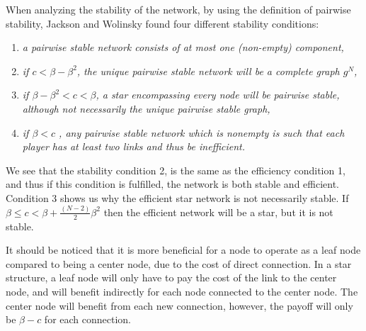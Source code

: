 When analyzing the stability of the network, by using the definition of pairwise stability, Jackson and Wolinsky found four different stability conditions:

\begin{enumerate}
\item \textit{a pairwise stable network consists of at most one (non-empty) component,}
\item \textit{if $c<\beta - \beta^2$, the unique pairwise stable network will be a complete graph $g^N$, }
\item \textit{if $\beta - \beta^2 <c < \beta $, a star encompassing every node will be pairwise stable, although not necessarily the unique pairwise stable graph,}
\item \textit{if $\beta < c$ , any pairwise stable network which is nonempty is such that each player has at least two links and thus be inefficient. }
\end{enumerate}
We see that the stability condition 2, is the same as the efficiency condition 1, and thus if this condition is fulfilled, the network is both stable and efficient. 
Condition 3 shows us why the efficient star network is not necessarily  stable. If $\beta \leq c <   \beta + \frac{(N-2)}{2}\beta^2$ then the efficient network will be a star, but it is not stable.

It should be noticed that it is more beneficial for a node to operate as a leaf node compared to being a center node, due to the cost of direct connection. In a star structure, a leaf node will only have to pay the cost of the link to the center node, and will benefit indirectly for each node connected to the center node. The center node will benefit from each new connection, however, the payoff will only be $\beta - c$ for each connection. 

